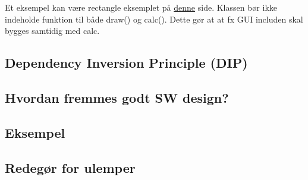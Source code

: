 Et eksempel kan være rectangle eksemplet på  \href{http://code.tutsplus.com/tutorials/solid-part-3-liskov-substitution-interface-segregation-principles--net-36710}{denne} side. Klassen bør ikke indeholde funktion til både draw() og calc(). Dette gør at at fx GUI includen skal bygges samtidig med calc.

\subsection{Dependency Inversion Principle (DIP)}

\subsection{Hvordan fremmes godt SW design?}

\subsection{Eksempel}

\subsection{Redegør for ulemper}